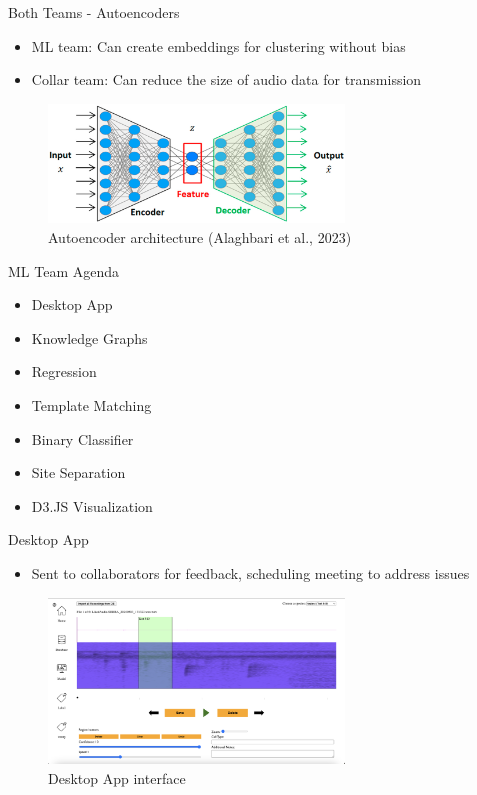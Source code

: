 \begin{frame}{Both Teams - Autoencoders}
    \begin{itemize}
        \item ML team: Can create embeddings for clustering without bias
        \item Collar team: Can reduce the size of audio data for transmission
    \end{itemize}
    \begin{figure}
        \centering
        \includegraphics[height=0.7\textheight,width=0.7\textwidth,keepaspectratio]{images/autoencoder.png}
        \caption{Autoencoder architecture (Alaghbari et al., 2023)}
    \end{figure}
\end{frame}

\begin{frame}{ML Team Agenda}
    \begin{itemize}
        \item Desktop App
        \item Knowledge Graphs
        \item Regression
        \item Template Matching
        \item Binary Classifier
        \item Site Separation
        \item D3.JS Visualization
    \end{itemize}
\end{frame}

\begin{frame}{Desktop App}
    \begin{itemize}
        \item Sent to collaborators for feedback, scheduling meeting to address issues
    \end{itemize}
    \begin{figure}
        \centering
        \includegraphics[height=0.7\textheight,width=0.7\textwidth,keepaspectratio]{images/desktop_app_1.png}
        \caption{Desktop App interface}
    \end{figure}
\end{frame}

